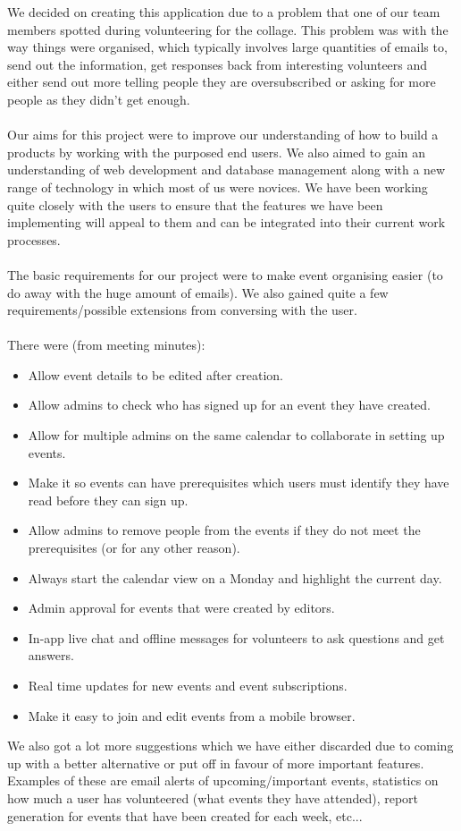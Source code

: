 \documentclass[10pt,a4paper]{article}
\begin{document}
\noindent We decided on creating this application due to a problem that one of our team members spotted during volunteering for the collage. This problem was with the way things were organised, which typically involves large quantities of emails to, send out the information, get responses back from interesting volunteers and either send out more telling people they are oversubscribed or asking for more people as they didn't get enough.
\\
\\
\noindent Our aims for this project were to improve our understanding of how to build a products by working with the purposed end users. We also aimed to gain an understanding of web development and database management along with a new range of technology in which most of us were novices. We have been working quite closely with the users to ensure that the features we have been implementing will appeal to them and can be integrated into their current work processes.
\\
\\
\noindent The basic requirements for our project were to make event organising easier (to do away with the huge amount of emails). We also gained quite a few requirements/possible extensions from conversing with the user.
\\
\\
\noindent There were (from meeting minutes):
\begin{itemize}
\setlength\itemsep{0.1em}
\item Allow event details to be edited after creation.
\item Allow admins to check who has signed up for an event they have created.
\item Allow for multiple admins on the same calendar to collaborate in setting up events. 
\item Make it so events can have prerequisites which users must identify they have read before they can sign up.
\item Allow admins to remove people from the events if they do not meet the prerequisites (or for any other reason).
\item Always start the calendar view on a Monday and highlight the current day.
\item Admin approval for events that were created by editors.
\item In-app live chat and offline messages for volunteers to ask questions and get answers.
\item Real time updates for new events and event subscriptions.
\item Make it easy to join and edit events from a mobile browser.  
\end{itemize}
\noindent We also got a lot more suggestions which we have either discarded due to coming up with a better alternative or put off in favour of more important features. Examples of these are email alerts of upcoming/important events, statistics on how much a user has volunteered (what events they have attended), report generation for events that have been created for each week, etc...
\end{document}

